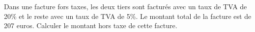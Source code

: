 
Dans une facture fors taxes, les deux tiers sont facturés avec un taux de TVA de 20\% et le reste avec un taux de TVA de 5\%. Le montant total de la facture est de 207 euros. Calculer le montant hors taxe de cette facture. 